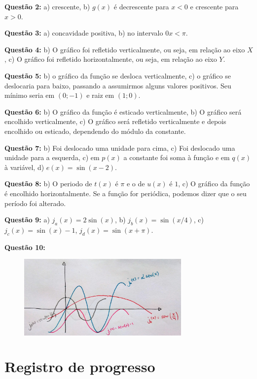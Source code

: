 \documentclass[main_estudante.tex]{subfiles}
\begin{document}
\noindent\textbf{Questão 2:} a) crescente, b) $g(x)$ é decrescente para $x<0$ e crescente para $x>0$.

\noindent\textbf{Questão 3:} a) concavidade positiva, b) no intervalo $0x<\pi$.

\noindent\textbf{Questão 4:} b) O gráfico foi refletido verticalmente, ou seja, em relação ao eixo $X$, c) O gráfico foi refletido horizontalmente, ou seja, em relação ao eixo $Y$.

\noindent\textbf{Questão 5:} b) o gráfico da função se desloca verticalmente, c) o gráfico se deslocaria para baixo, passando a assumirmos alguns valores positivos. Seu mínimo seria em $(0;-1)$ e raiz em $(1;0)$.

\noindent\textbf{Questão 6:} b) O gráfico da função é esticado verticalmente, b) O gráfico será encolhido verticalmente, c) O gráfico será refletido verticalmente e depois encolhido ou esticado, dependendo do módulo da constante.

\noindent\textbf{Questão 7:} b) Foi deslocado uma unidade para cima, c) Foi deslocado uma unidade para a esquerda, c) em $p(x)$ a constante foi soma à função e em $q(x)$ à variável, d) $e(x)=\sin(x-2)$.

\noindent\textbf{Questão 8:} b) O periodo de $t(x)$ é $\pi$ e o de $u(x)$ é $1$, c) O gráfico da função é encolhido horizontalmente. Se a função for periódica, podemos dizer que o seu período foi alterado.

\noindent\textbf{Questão 9:} a) $j_a(x)=2\sin(x)$, b) $j_b(x)=\sin(x/4)$, c)$j_c(x)=\sin(x)-1$, $j_d(x)=\sin(x+\pi)$.

\noindent\textbf{Questão 10:}

\begin{figure}[h]
\centering
\includegraphics[width=0.75\textwidth]{./img/c7g10.jpg}
\end{figure}

\newpage

\section{Registro de progresso}
\end{document}
